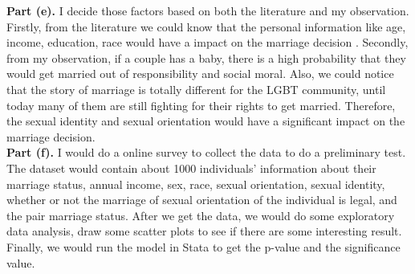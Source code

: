 \documentclass[letterpaper,12pt]{article}
\theoremstyle{definition}
\begin{document}
\textbf{Part (e).} 
I decide those factors based on both the literature and my observation. Firstly, from the literature we could know that the personal information like age, income, education, race would have a impact on the marriage decision . Secondly, from my observation, if a couple has a baby, there is a high probability that they would get married out of responsibility and social moral. Also, we could notice that the story of marriage is totally different for the LGBT community, until today many of them are still fighting for their rights to get married. Therefore, the sexual identity and sexual orientation would have a significant impact on the marriage decision.
\\

\textbf{Part (f).} 
I would do a online survey to collect the data to do a preliminary test. The dataset would contain about 1000 individuals' information about their marriage status, annual income, sex, race, sexual orientation, sexual identity, whether or not the marriage of sexual orientation of the individual is legal, and the pair marriage status. After we get the data, we would do some exploratory data analysis, draw some scatter plots to see if there are some interesting result. Finally, we would run the model in Stata to get the p-value and the significance value.
\\
\end{document}
